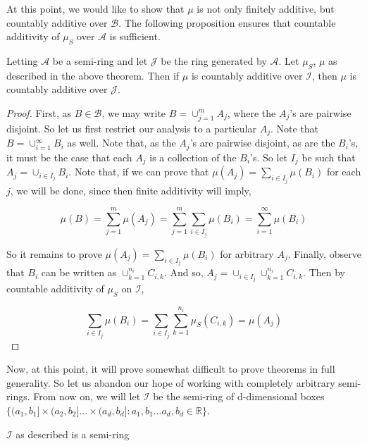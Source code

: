 At this point, we would like to show that $\mu$ is not only finitely additive, but 
countably additive over $\mathcal B$. The following proposition ensures that countable 
additivity of $\mu_S$ over $\mathcal A$ is sufficient.

\begin{theorem}
   Letting $\mathcal A$ be a semi-ring and let $\mathcal J$ be the ring generated by $\mathcal A$. Let
   $\mu_S$, $\mu$ as described in the above theorem. Then if $\mu$ is countably additive 
   over $\mathcal I$, then $\mu$ is countably additive over $\mathcal J$.
\end{theorem}

\begin{proof}

   First, as $B \in \mathcal B$, we may write $B = \cup_{j=1}^m A_j$, where the $A_j$'s are pairwise 
   disjoint. So let us first restrict our analysis to a particular $A_j$. Note that 
   $B = \cup_{i=1}^\infty B_i$ as well. Note that, as the $A_j$'s are pairwise disjoint, as are 
   the $B_i$'s, it must be the case that each $A_j$ is a collection of the $B_i$'s. 
   So let $I_j$ be such that $A_j = \cup_{i \in I_j}B_i$. Note that, if we can prove that 
   $\mu(A_j) = \sum_{i \in I_j}\mu(B_i)$ for each $j$, we will be done, since then 
   finite additivity will imply,

   \[ \mu(B) = \sum_{j=1}^m \mu(A_j) = \sum_{j=1}^m \sum_{i \in I_j}\mu(B_i) = \sum_{i=1}^\infty \mu(B_i) \]

   So it remains to prove $\mu(A_j) = \sum_{i \in I_j}\mu(B_i)$ for arbitrary $A_j$. Finally, 
   observe that $B_i$ can be written as $\cup_{k=1}^{n_i}C_{i,k}$. And so, $A_j = \cup_{i \in I_j}\cup_{k=1}^{n_i}C_{i,k}$. 
   Then by countable additivity of $\mu_S$ on $\mathcal I$,

   \[ \sum_{i \in I_j} \mu(B_i) = \sum_{i \in I_j} \sum_{k=1}^{n_i}\mu_S(C_{i,k}) = \mu(A_j) \]


\end{proof} 

Now, at this point, it will prove somewhat difficult to prove theorems in full generality. 
So let us abandon our hope of working with completely arbitrary semi-rings. From now on, 
we will let $\mathcal I$ be the semi-ring of d-dimensional boxes 
$\{(a_1, b_1] \times (a_2, b_2] ... \times (a_d, b_d] : a_1,b_1...a_d,b_d \in \mathbb R\}$. 

\begin{Proposition}
   $\mathcal I$ as described is a semi-ring
\end{Proposition}


